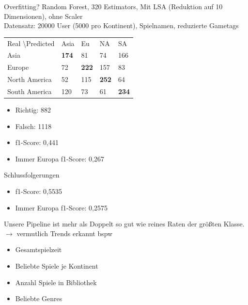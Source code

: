 \documentclass[12pt]{beamer}
\begin{document}
\begin{frame}[fragile]{Overfitting?}
	Random Forest, 320 Estimators, Mit LSA (Reduktion auf 10 Dimensionen), ohne Scaler \\
	Datensatz: 20000 User (5000 pro Kontinent), Spielnamen, reduzierte Gametags \\
	\medskip
	\begin{tabular}{| l| l| l| l| l|}
		\hline
		Real \textbackslash Predicted & Asia & Eu & NA & SA \\
		Asia & \textbf{174} & 81 & 74 & 166 \\
		Europe & 72 & \textbf{222} & 157 & 83 \\
		North America & 52 & 115 & \textbf{252} & 64 \\
		South America & 120 & 73 & 61 & \textbf{234} \\
		\hline
	\end{tabular}
	\begin{itemize}
		\item Richtig: 882
		\item Falsch: 1118
		\item f1-Score: 0,441
		\item Immer Europa f1-Score: 0,267
	\end{itemize}
\end{frame}

\begin{frame}[fragile]{Schlussfolgerungen}
	\begin{itemize}
		\item f1-Score: 0,5535
		\item Immer Europa f1-Score: 0,2575
	\end{itemize}
	Unsere Pipeline ist mehr als Doppelt so gut wie reines Raten der größten Klasse. \\
	$ \rightarrow $ vermutlich Trends erkannt bspw
	\begin{itemize}
		\item Gesamtspielzeit
		\item Beliebte Spiele je Kontinent
		\item Anzahl Spiele in Bibliothek
		\item Beliebte Genres
	\end{itemize}  
\end{frame}
\end{document}
